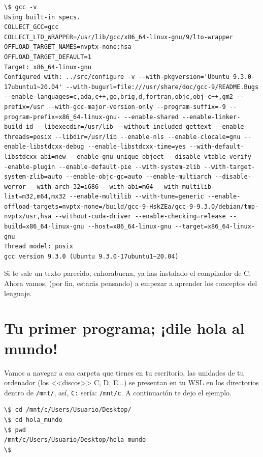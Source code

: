 \documentclass[a4paper]{article}
\begin{document}
\noindent
\begin{minipage}[H]{\linewidth}
\mbox{}
\begin{lstlisting}[style=terminalStyle]
\$ gcc -v
Using built-in specs.
COLLECT_GCC=gcc
COLLECT_LTO_WRAPPER=/usr/lib/gcc/x86_64-linux-gnu/9/lto-wrapper
OFFLOAD_TARGET_NAMES=nvptx-none:hsa
OFFLOAD_TARGET_DEFAULT=1
Target: x86_64-linux-gnu
Configured with: ../src/configure -v --with-pkgversion='Ubuntu 9.3.0-17ubuntu1~20.04' --with-bugurl=file:///usr/share/doc/gcc-9/README.Bugs --enable-languages=c,ada,c++,go,brig,d,fortran,objc,obj-c++,gm2 --prefix=/usr --with-gcc-major-version-only --program-suffix=-9 --program-prefix=x86_64-linux-gnu- --enable-shared --enable-linker-build-id --libexecdir=/usr/lib --without-included-gettext --enable-threads=posix --libdir=/usr/lib --enable-nls --enable-clocale=gnu --enable-libstdcxx-debug --enable-libstdcxx-time=yes --with-default-libstdcxx-abi=new --enable-gnu-unique-object --disable-vtable-verify --enable-plugin --enable-default-pie --with-system-zlib --with-target-system-zlib=auto --enable-objc-gc=auto --enable-multiarch --disable-werror --with-arch-32=i686 --with-abi=m64 --with-multilib-list=m32,m64,mx32 --enable-multilib --with-tune=generic --enable-offload-targets=nvptx-none=/build/gcc-9-HskZEa/gcc-9-9.3.0/debian/tmp-nvptx/usr,hsa --without-cuda-driver --enable-checking=release --build=x86_64-linux-gnu --host=x86_64-linux-gnu --target=x86_64-linux-gnu
Thread model: posix
gcc version 9.3.0 (Ubuntu 9.3.0-17ubuntu1~20.04)
\end{lstlisting}
\end{minipage}


Si te sale un texto parecido, enhorabuena, ya has instalado el compilador de C.
Ahora vamos, (por fin, estarás pensando) a empezar a aprender los conceptos del
lenguaje.


\section{Tu primer programa; ¡dile hola al mundo!}

Vamos a navegar a esa carpeta que tienes en tu escritorio, las unidades de tu
ordenador (los <<discos>> C, D, E...) se presentan en tu WSL en los
directorios dentro de
\verb!/mnt/!, así, \verb!C:! sería: \verb!/mnt/c!. A continuación te dejo el
ejemplo.


\noindent
\begin{minipage}[H]{\linewidth}
\mbox{}
\begin{lstlisting}[style=terminalStyle]
\$ cd /mnt/c/Users/Usuario/Desktop/
\$ cd hola_mundo
\$ pwd
/mnt/c/Users/Usuario/Desktop/hola_mundo
\$
\end{lstlisting}
\end{minipage}
\end{document}
